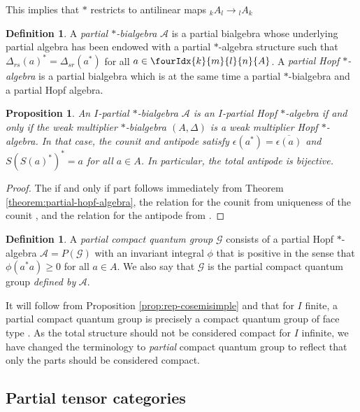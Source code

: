 \documentclass[10pt]{article}
\newcommand{\GrDA}[3]{{}_{#2}#1_{#3}} %
\newcommand{\Gr}[5]{\fourIdx{#2}{#4}{#3}{#5}{#1}}%
\newtheorem{Prop}[Theorem]{Proposition}
\theoremstyle{definition}
\newtheorem{Def}[Theorem]{Definition}
\numberwithin{equation}{section}
\begin{document}
This implies that $*$ restricts to antilinear maps $\GrDA{A}{k}{l}\rightarrow \GrDA{A}{l}{k}$

\begin{Def} A \emph{partial $*$-bialgebra} $\mathscr{A}$ is a
 partial bialgebra whose underlying partial algebra has been
  endowed with a partial $*$-algebra structure such that
$\Delta_{rs}(a)^* = \Delta_{sr}(a^*)$ for all $a \in \Gr{A}{k}{l}{m}{n}$.
A \emph{partial Hopf $*$-algebra} is a partial bialgebra which is at the same time a partial $*$-bialgebra and a partial Hopf algebra.
\end{Def} 

\begin{Prop} \label{cor:involutive}
  An $I$-partial $*$-bialgebra $\mathscr{A}$ is an $I$-partial Hopf
  $*$-algebra if and only if the weak multiplier $*$-bialgebra
  $(A,\Delta)$ is a weak multiplier Hopf $*$-algebra. In that case,
  the counit and antipode satisfy
  $\epsilon(a^{*})=\overline{\epsilon(a)}$ and $S(S(a)^{*})^{*}=a$ for
  all $a\in A$. In particular, the total antipode is bijective.
\end{Prop}
\begin{proof}
  The if and only if part follows immediately from  Theorem
  \ref{theorem:partial-hopf-algebra}, the relation for the counit  from
uniqueness of the counit  \cite[Theorem 2.8]{Boh1}, and the relation
for the antipode from \cite[Proposition 4.11]{VDW1}.
\end{proof}

\begin{Def}\label{DefPCQG} A \emph{partial compact quantum group} $\mathscr{G}$ consists of a
  partial Hopf $*$-algebra $\mathscr{A} = P(\mathscr{G})$ with an invariant integral  $\phi$ that is positive in the sense  that $\phi(a^*a)\geq 0$ for all $a\in A$. We also say that $\mathscr{G}$ is the partial compact quantum group \emph{defined by} $\mathscr{A}$.
\end{Def} 

It will follow from Proposition \ref{prop:rep-cosemisimple} and  \cite[Theorem 3.3 and Theorem 4.4]{Hay1} that for $I$ finite, a partial compact quantum group is precisely a compact quantum group of face type \cite[Definition 4.1]{Hay1}. As the total structure should not be considered compact for $I$ infinite, we have changed the terminology to \emph{partial} compact quantum group to reflect that only the parts should be considered compact.

\subsection{Partial tensor categories}\label{SecPartTen}
\end{document}
